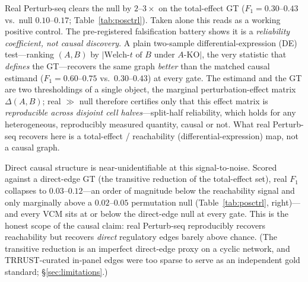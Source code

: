 \documentclass{article}
\theoremstyle{plain}
\theoremstyle{definition}
\theoremstyle{remark}
\begin{document}
Real Perturb-seq clears the null by $2$--$3\times$ on the total-effect GT ($F_1 = 0.30$--$0.43$ vs.\ null $0.10$--$0.17$; Table~\ref{tab:posctrl}). Taken alone this reads as a working positive control. The pre-registered falsification battery shows it is a \emph{reliability coefficient, not causal discovery}. A plain two-sample differential-expression (DE) test---ranking $(A,B)$ by $|\text{Welch-}t\text{ of }B\text{ under }A\text{-KO}|$, the very statistic that \emph{defines} the GT---recovers the same graph \emph{better} than the matched causal estimand ($F_1 = 0.60$--$0.75$ vs.\ $0.30$--$0.43$) at every gate. The estimand and the GT are two thresholdings of a single object, the marginal perturbation-effect matrix $\Delta(A,B)$; real $\gg$ null therefore certifies only that this effect matrix is \emph{reproducible across disjoint cell halves}---split-half reliability, which holds for any heterogeneous, reproducibly measured quantity, causal or not. What real Perturb-seq recovers here is a total-effect / reachability (differential-expression) map, not a causal graph.

Direct causal structure is near-unidentifiable at this signal-to-noise. Scored against a direct-edge GT (the transitive reduction of the total-effect set), real $F_1$ collapses to $0.03$--$0.12$---an order of magnitude below the reachability signal and only marginally above a $0.02$--$0.05$ permutation null (Table~\ref{tab:posctrl}, right)---and every VCM sits at or below the direct-edge null at every gate. This is the honest scope of the causal claim: real Perturb-seq reproducibly recovers reachability but recovers \emph{direct} regulatory edges barely above chance. (The transitive reduction is an imperfect direct-edge proxy on a cyclic network, and TRRUST-curated in-panel edges were too sparse to serve as an independent gold standard; \S\ref{sec:limitations}.)
\end{document}
